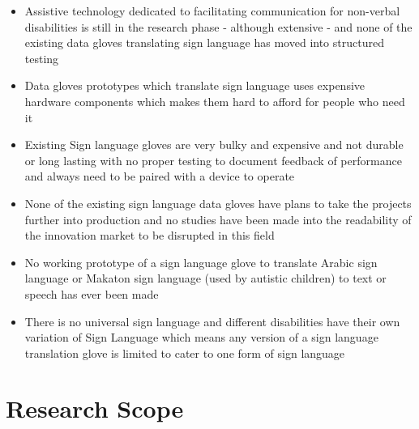 \begin{itemize}
    \item Assistive technology dedicated to facilitating communication for non-verbal disabilities is still in the research phase - although extensive - and none of the existing data gloves translating sign language has moved into structured testing 
    \item Data gloves prototypes which translate sign language uses expensive hardware components which makes them hard to afford for people who need it 
    \item Existing Sign language gloves are very bulky and expensive and not durable or long lasting with no proper testing to document feedback of performance and always need to be paired with a device to operate 
    \item None of the existing sign language data gloves have plans to take the projects further into production and no studies have been made into the readability of the innovation market to be disrupted in this field 
    \item No working prototype of a sign language glove to translate Arabic sign language or Makaton sign language (used by autistic children) to text or speech has ever been made
    \item There is no universal sign language and different disabilities have their own variation of Sign Language which means any version of a sign language translation glove is limited to cater to one form of sign language 
\end{itemize}

\section{Research Scope}

